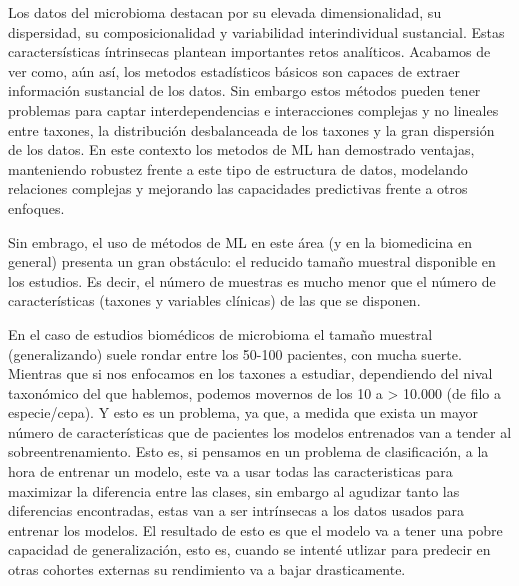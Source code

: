 

Los datos del microbioma destacan por su elevada dimensionalidad, su dispersidad, su composicionalidad y variabilidad interindividual sustancial. Estas caractersísticas íntrinsecas plantean importantes retos analíticos. Acabamos de ver como, aún así, los metodos estadísticos básicos son capaces de extraer información sustancial de los datos. Sin embargo estos métodos pueden tener problemas para captar interdependencias e interacciones complejas y no lineales entre taxones, la distribución desbalanceada de los taxones y la gran dispersión de los datos. En este contexto los metodos de ML han demostrado ventajas, manteniendo robustez frente a este tipo de estructura de datos, modelando relaciones complejas y mejorando las capacidades predictivas frente a otros enfoques.


Sin embrago, el uso de métodos de ML en este área (y en la biomedicina en general) presenta un gran obstáculo: el reducido tamaño muestral disponible en los estudios. Es decir, el número de muestras es mucho menor que el número de características (taxones y variables clínicas) de las que se disponen.

En el caso de estudios biomédicos de microbioma el tamaño muestral (generalizando) suele rondar entre los 50-100 pacientes, con mucha suerte. Mientras que si nos enfocamos en los taxones a estudiar, dependiendo del nival taxonómico del que hablemos, podemos movernos de los 10 a > 10.000 (de filo a especie/cepa). Y esto es un problema, ya que, a medida que exista un mayor número de características que de pacientes los modelos entrenados van a tender al sobreentrenamiento. Esto es, si pensamos en un problema de clasificación, a la hora de entrenar un modelo, este va a usar todas las caracteristicas para maximizar la diferencia entre las clases, sin embargo al agudizar tanto las diferencias encontradas, estas van a ser intrínsecas a los datos usados para entrenar los modelos. El resultado de esto es que el modelo va a tener una pobre capacidad de generalización, esto es, cuando se intenté utlizar para predecir en otras cohortes externas su rendimiento va a bajar drasticamente.

